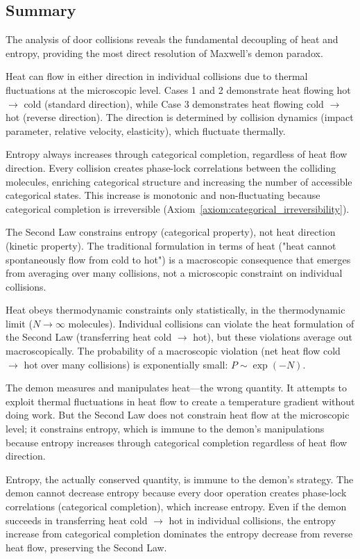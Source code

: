 \documentclass[12pt,a4paper]{article}
\theoremstyle{definition}
\theoremstyle{remark}
\begin{document}
\subsection{Summary}

The analysis of door collisions reveals the fundamental decoupling of heat and entropy, providing the most direct resolution of Maxwell's demon paradox.

Heat can flow in either direction in individual collisions due to thermal fluctuations at the microscopic level. Cases 1 and 2 demonstrate heat flowing hot $\to$ cold (standard direction), while Case 3 demonstrates heat flowing cold $\to$ hot (reverse direction). The direction is determined by collision dynamics (impact parameter, relative velocity, elasticity), which fluctuate thermally.

Entropy always increases through categorical completion, regardless of heat flow direction. Every collision creates phase-lock correlations between the colliding molecules, enriching categorical structure and increasing the number of accessible categorical states. This increase is monotonic and non-fluctuating because categorical completion is irreversible (Axiom~\ref{axiom:categorical_irreversibility}).

The Second Law constrains entropy (categorical property), not heat direction (kinetic property). The traditional formulation in terms of heat ("heat cannot spontaneously flow from cold to hot") is a macroscopic consequence that emerges from averaging over many collisions, not a microscopic constraint on individual collisions.

Heat obeys thermodynamic constraints only statistically, in the thermodynamic limit ($N \to \infty$ molecules). Individual collisions can violate the heat formulation of the Second Law (transferring heat cold $\to$ hot), but these violations average out macroscopically. The probability of a macroscopic violation (net heat flow cold $\to$ hot over many collisions) is exponentially small: $P \sim \exp(-N)$.

The demon measures and manipulates heat—the wrong quantity. It attempts to exploit thermal fluctuations in heat flow to create a temperature gradient without doing work. But the Second Law does not constrain heat flow at the microscopic level; it constrains entropy, which is immune to the demon's manipulations because entropy increases through categorical completion regardless of heat flow direction.

Entropy, the actually conserved quantity, is immune to the demon's strategy. The demon cannot decrease entropy because every door operation creates phase-lock correlations (categorical completion), which increase entropy. Even if the demon succeeds in transferring heat cold $\to$ hot in individual collisions, the entropy increase from categorical completion dominates the entropy decrease from reverse heat flow, preserving the Second Law.
\end{document}
